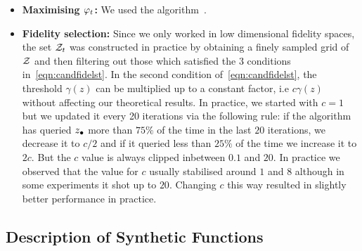 \begin{itemize}[leftmargin=0.0in]
\vspace{-0.05in}
\item[]
\textbf{Maximising $\varphi_t$:}
We used the \directs algorithm~\citep{jones93direct}.

\item[]
\textbf{Fidelity selection:}
Since we only worked in low dimensional fidelity spaces, the set $\mathcal{Z}_t$
was constructed in practice by obtaining a finely sampled grid of $\mathcal{Z}$ and then
filtering out those which satisfied the $3$ conditions in~\eqref{eqn:candfidelst}.
In the second condition of~\eqref{eqn:candfidelst}, the threshold $\gamma(z)$ can
be multiplied up to a constant factor, i.e $c\gamma(z)$ without affecting our theoretical
results.
In practice, we started with $c=1$ but we updated it every 20 iterations via the following
rule: if the algorithm has queried $z_{\bullet}$ more than $75\%$ of the time in the last $20$
iterations, we decrease it to $c/2$ and if it queried less than $25\%$ of the time
we increase it to $2c$.
But the $c$ value is always clipped inbetween $0.1$ and $20$.
In practice we observed that the value for $c$ usually stabilised around
$1$ and $8$ although in some experiments it shot up to $20$.
Changing $c$ this way  resulted in slightly better performance in practice.


\end{itemize}


\subsection{Description of Synthetic Functions}
\label{sec:appSynthetic}

